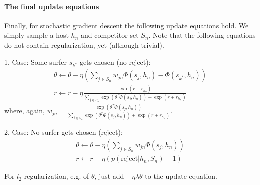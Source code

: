 \paragraph{The final update equations}

Finally, for stochastic gradient descent the following update equations hold. We simply sample a host $h_n$ and competitor set $S_n$. Note that the following equations do not contain regularization, yet (although trivial).

1. Case: Some surfer $s_{k^*}$ gets chosen (no reject):
\begin{eqnarray}
\theta \leftarrow \theta - \eta (\sum_{j \in S_n} w_{jn} \Phi(s_j,h_n) - \Phi(s_{k^*},h_n))\\
r \leftarrow r - \eta \frac{\exp(r + r_{h_n})}{\sum_{j \in S_n} \exp(\theta^T \Phi(s_j,h_n)) + \exp(r + r_{h_n})}
\end{eqnarray}
where, again, $w_{jn}=\frac{\exp(\theta^T \Phi(s_j,h_n))}{\sum_{j \in S_n} \exp(\theta^T \Phi(s_j,h_n)) + \exp(r + r_{h_n})}$.

2. Case: No surfer gets chosen (reject):
\begin{eqnarray}
\theta \leftarrow \theta - \eta (\sum_{j \in S_n} w_{jn} \Phi(s_j,h_n))\\
r \leftarrow r - \eta (p(\text{reject} | h_n, S_n)-1)
\end{eqnarray}

For $l_2$-regularization, e.g. of $\theta$, just add $- \eta \lambda \theta$ to the update equation.
